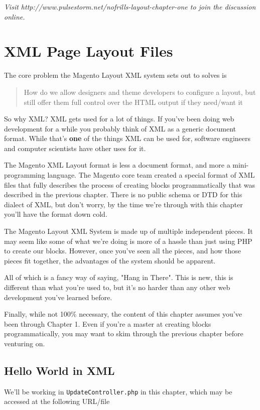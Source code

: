 \documentclass[oneside]{book}
\begin{document}
\emph{Visit http://www.pulsestorm.net/nofrills-layout-chapter-one to join the discussion online.}
\chapter{XML Page Layout Files}
The core problem the Magento Layout XML system sets out to solves is

\begin{quote}
How do we allow designers and theme developers to configure a layout, but still offer them full control over the HTML output if they need/want it
\end{quote}

So why XML? XML gets used for a lot of things.  If you've been doing web development for a while you probably think of XML as a generic document format. While that's \textbf{one} of the things XML can be used for, software engineers and computer scientists have other uses for it.  

The Magento XML Layout format is less a document format, and more a mini-programming language.  The Magento core team created a special format of XML files that fully describes the process of creating blocks programmatically that was described in the previous chapter.  There is no public schema or DTD for this dialect of XML, but don't worry, by the time we're through with this chapter you'll have the format down cold.

The Magento Layout XML System is made up of multiple independent pieces.  It may seem like some of what we're doing is more of a hassle than just using PHP to create our blocks.  However, once you've seen all the pieces, and how those pieces fit together, the advantages of the system should be apparent.

All of which is a fancy way of saying, "Hang in There".  This is new, this is different than what you're used to, but it's no harder than any other web development you've learned before.  

Finally, while not 100\% necessary, the content of this chapter assumes you've been through Chapter 1.  Even if you're a master at creating blocks programmatically, you may want to skim through the previous chapter before venturing on.

\section{Hello World in XML}

We'll be working in \footnotesize\texttt{UpdateController.php} \normalsize  in this chapter, which may be accessed at the following URL/file
\end{document}
